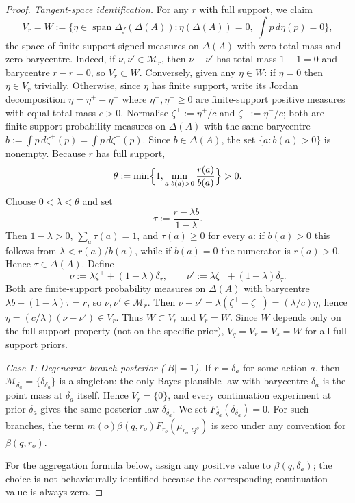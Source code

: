 \documentclass[11pt,a4paper]{article}
\theoremstyle{definition}
\newcommand{\1}{\mathbf 1}
\begin{document}
\begin{proof}
\emph{Tangent-space identification.}  For any $r$ with full support, we claim
\[
V_r=W:=\{\eta\in\operatorname{span}\Delta_f(\Delta(A)):\eta(\Delta(A))=0,\ \textstyle\int p\,d\eta(p)=0\},
\]
the space of finite-support signed measures on $\Delta(A)$ with zero total mass and zero barycentre.
Indeed, if $\nu,\nu'\in\mathcal M_r$, then $\nu-\nu'$ has total mass $1-1=0$ and barycentre $r-r=0$, so $V_r\subset W$.
Conversely, given any $\eta\in W$: if $\eta=0$ then $\eta\in V_r$ trivially.  Otherwise, since $\eta$ has finite support,
	write its Jordan decomposition $\eta=\eta^+-\eta^-$ where $\eta^+,\eta^-\ge 0$ are finite-support positive measures
	with equal total mass $c>0$.  Normalise $\zeta^+:=\eta^+/c$ and $\zeta^-:=\eta^-/c$; both are finite-support probability
	measures on $\Delta(A)$ with the same barycentre
	$b:=\int p\,d\zeta^+(p)=\int p\,d\zeta^-(p)$.  Since $b\in\Delta(A)$, the set $\{a:b(a)>0\}$ is nonempty.  Because $r$
	has full support,
	\[
	\theta:=\min\Bigl\{1,\min_{a:b(a)>0}\frac{r(a)}{b(a)}\Bigr\}>0.
	\]
	Choose $0<\lambda<\theta$ and set
	\[
	\tau:=\frac{r-\lambda b}{1-\lambda}.
	\]
	Then $1-\lambda>0$, $\sum_a\tau(a)=1$, and $\tau(a)\ge0$ for every $a$: if $b(a)>0$ this follows from
	$\lambda<r(a)/b(a)$, while if $b(a)=0$ the numerator is $r(a)>0$.  Hence $\tau\in\Delta(A)$.  Define
	\[
	\nu:=\lambda\zeta^++(1-\lambda)\delta_\tau,
	\qquad
	\nu':=\lambda\zeta^-+(1-\lambda)\delta_\tau.
	\]
	Both are finite-support probability measures on $\Delta(A)$ with barycentre $\lambda b+(1-\lambda)\tau=r$, so
	$\nu,\nu'\in\mathcal M_r$.  Then $\nu-\nu'=\lambda(\zeta^+-\zeta^-)=(\lambda/c)\eta$, hence
	$\eta=(c/\lambda)(\nu-\nu')\in V_r$.  Thus $W\subset V_r$ and $V_r=W$.
Since $W$ depends only on the full-support property (not on the specific prior), $V_q=V_r=V_s=W$ for all full-support priors.

\emph{Case 1: Degenerate branch posterior ($|B|=1$).}  If $r=\delta_a$ for some action $a$, then
	$\mathcal M_{\delta_a}=\{\delta_{\delta_a}\}$ is a singleton: the only Bayes-plausible law with barycentre $\delta_a$
	is the point mass at $\delta_a$ itself.  Hence $V_r=\{0\}$, and every continuation experiment at prior $\delta_a$ gives
	the same posterior law $\delta_{\delta_a}$.  We set $F_{\delta_a}(\delta_{\delta_a})=0$.  For such branches, the term
	$m(o)\beta(q,r_o)F_{r_o}(\mu_{r_o,Q^o})$ is zero under any convention for $\beta(q,r_o)$.

For the aggregation formula below, assign any positive value to $\beta(q,\delta_a)$; the choice is not behaviourally
identified because the corresponding continuation value is always zero.



\end{proof}
\end{document}
